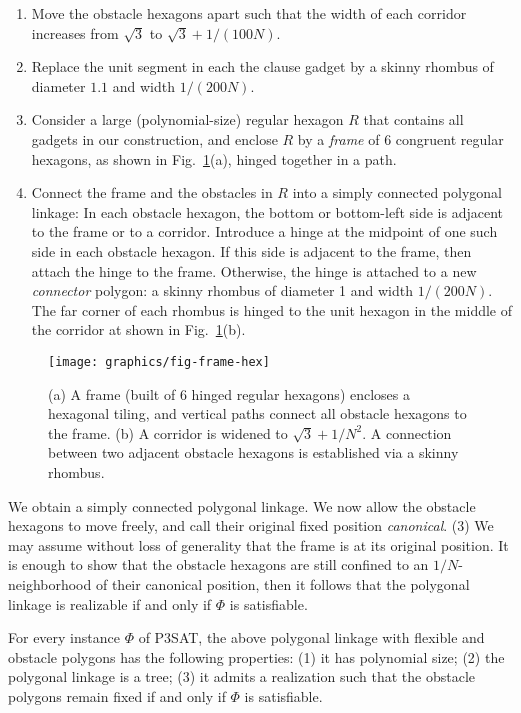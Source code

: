 \begin{enumerate}
\item Move the obstacle hexagons apart such that the width of each corridor increases from $\sqrt{3}$ to $\sqrt{3}+1/(100N)$.
\item Replace the unit segment in each the clause gadget by a skinny rhombus of diameter $1.1$ and width $1/(200N)$.
\item Consider a large (polynomial-size) regular hexagon $R$ that contains all gadgets in our construction, and enclose $R$ by a \emph{frame} of 6 congruent regular hexagons, as shown in Fig.~\ref{fig:frame}(a), hinged together in a path.
\item Connect the frame and the obstacles in $R$ into a simply connected polygonal linkage: In each obstacle hexagon, the bottom or bottom-left side is adjacent to the frame or to a corridor. Introduce a hinge at the midpoint of one such side in each obstacle hexagon. If this side is adjacent to the frame, then attach the hinge to the frame. Otherwise, the hinge is attached to a new \emph{connector} polygon: a skinny rhombus of diameter 1 and width $1/(200N)$. The far corner of each rhombus is hinged to the unit hexagon in the middle of the corridor at shown in Fig.~\ref{fig:frame}(b).
\end{enumerate}

\begin{figure}[htbp]
	\centering
	\texttt{[image: graphics/fig-frame-hex]}
	\caption{(a) A frame (built of 6 hinged regular hexagons) encloses a hexagonal tiling, and
    vertical paths connect all obstacle hexagons to the frame.
    (b) A corridor is widened to $\sqrt{3}+1/N^2$. A connection between
    two adjacent obstacle hexagons is established via a skinny rhombus.}
	\label{fig:frame}
\end{figure}
We obtain a simply connected polygonal linkage. 
We now allow the obstacle hexagons to move freely, and call their original fixed position \emph{canonical}. 
\noindent (3) We may assume without loss of generality that the frame is at its original position. 
It is enough to show that the obstacle hexagons are still confined to an $1/N$-neighborhood of their canonical position, then it
follows that the polygonal linkage is realizable if and only if $\Phi$ is satisfiable.














\begin{lem}\label{lem:aux}
For every instance $\Phi$ of P3SAT, the above polygonal linkage with flexible and obstacle polygons has the following properties: (1) it has polynomial size; (2) the polygonal linkage is a tree;
(3) it admits a realization such that the obstacle polygons remain fixed if and only if $\Phi$ is satisfiable.
\end{lem}
